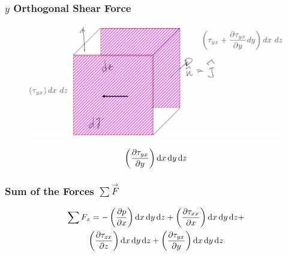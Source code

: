 \subsubsection{$y$ Orthogonal Shear Force}
\begin{figure}[H]
  \centering
  \includegraphics[width = 0.6 \textwidth]{./img/forceinxy.png}
\end{figure}
\begin{equation}
  \left( \frac{\partial \tau_{yx}}{\partial y} \right) \dif x \dif y \dif z
\end{equation}
\subsubsection{Sum of the Forces $\sum \vec{F}$}
\begin{multline}
  \sum F_x = - \left( \frac{\partial p}{\partial x} \right) \dif x \dif y \dif z + \left( \frac{\partial \tau_{xx}}{\partial x} \right) \dif x \dif y \dif z + \\ \left( \frac{\partial \tau_{zx}}{\partial z} \right) \dif x \dif y \dif z + \left( \frac{\partial \tau_{yx}}{\partial y} \right) \dif x \dif y \dif z
\end{multline}
